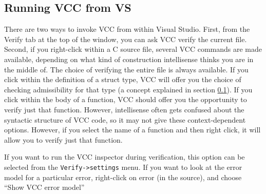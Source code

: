 \subsection{Running VCC from VS}
There are two ways to invoke VCC from within Visual
Studio. First,
from the Verify tab at the top of the window, you can ask VCC verify
the current file. Second, if you right-click within a C source file,
several VCC commands are made available, depending on what kind of
construction intellisense thinks you are in the middle of. The choice
of verifying the entire file is always available. If you click within
the definition of a struct type, VCC will offer you the choice of
checking admissibility for that type (a concept explained in
section \ref{}). If you click within the body of a function, VCC should offer
you the opportunity to verify just that function. However,
intellisense often gets confused about the syntactic structure of
VCC code, so it may not give these context-dependent
options. However, if you select the name of a function and then right
click, it will allow you to verify just that function.

If you want to run the VCC inspector during verification, this
option can be selected from the \verb!Verify->settings! menu. If you want
to look at the error model for a particular error, right-click on
error (in the source), and choose ``Show VCC error model''



